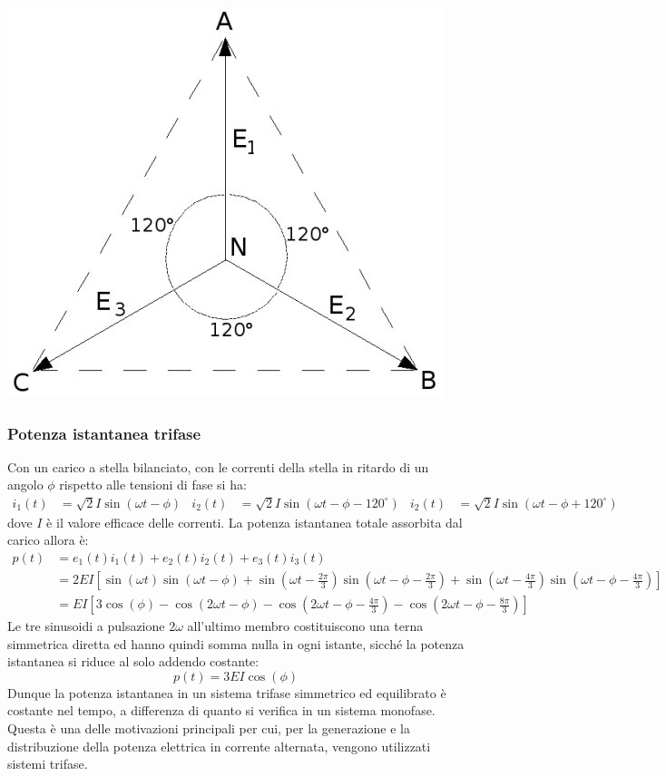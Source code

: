 \documentclass{article}
\begin{document}
\begin{center}
    \includegraphics[scale=0.25]{Image/Diagramma_delle_fasi_nel_sistema_trifase.jpg}
\end{center}


\subsubsection{Potenza istantanea trifase}
Con un carico a stella bilanciato, con le correnti della stella in ritardo di un angolo $\phi$ rispetto alle tensioni di fase si ha:
\begin{align*}
    i_1(t) &= \sqrt{2} I \sin\left(\omega t - \phi\right) 
    &
    i_2(t) &= \sqrt{2} I \sin\left(\omega t - \phi - 120^{\circ}\right)
    &
    i_2(t) &= \sqrt{2} I \sin\left(\omega t - \phi + 120^{\circ}\right)
\end{align*}
dove $I$ è il valore efficace delle correnti. La potenza istantanea totale assorbita dal carico allora è:
\begin{align*}
    p(t) &= e_1(t)i_1(t) + e_2(t)i_2(t) + e_3(t)i_3(t)
    \\
    &=2EI \left[\sin(\omega t) \sin(\omega t - \phi)+\sin \left(\omega t - \frac{2 \pi}{3}\right)\sin \left(\omega t - \phi - \frac{2 \pi}{3}\right)+\sin\left(\omega t - \frac{4 \pi}{3}\right)\sin\left(\omega t - \phi - \frac{4 \pi}{3}\right)\right]
    \\
    &= EI \left[3 \cos(\phi) - \cos(2 \omega t - \phi) - \cos \left(2 \omega t - \phi - \frac{4 \pi}{3}\right)-\cos\left(2 \omega t - \phi - \frac{8 \pi}{3}\right)\right]
\end{align*}
Le tre sinusoidi a pulsazione $2 \omega$ all'ultimo membro costituiscono una terna simmetrica diretta ed hanno quindi somma nulla in ogni istante, sicché la potenza
istantanea si riduce al solo addendo costante:
\[p(t) = 3 EI \cos(\phi)\]
Dunque la potenza istantanea in un sistema trifase simmetrico ed equilibrato è
costante nel tempo, a differenza di quanto si verifica in un sistema monofase. Questa è una delle motivazioni principali per cui, per la generazione e la distribuzione della potenza elettrica in corrente alternata, vengono utilizzati sistemi trifase.
\end{document}
